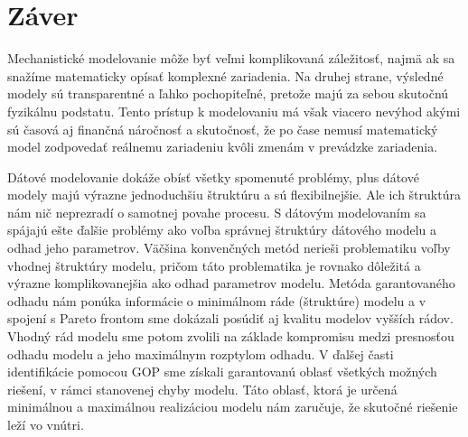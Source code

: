 \chapter{Záver}
Mechanistické modelovanie môže byť veľmi komplikovaná záležitosť, najmä ak sa snažíme matematicky opísať komplexné zariadenia. Na druhej strane, výsledné modely sú transparentné a ľahko pochopiteľné, pretože majú za sebou skutočnú fyzikálnu podstatu. Tento prístup k modelovaniu má však viacero nevýhod akými sú časová aj finančná náročnosť a skutočnosť, že po čase nemusí matematický model zodpovedať reálnemu zariadeniu kvôli zmenám v prevádzke zariadenia. 

Dátové modelovanie dokáže obísť všetky spomenuté problémy, plus dátové modely majú výrazne jednoduchšiu štruktúru a sú flexibilnejšie. Ale ich štruktúra nám nič neprezradí o samotnej povahe procesu. S dátovým modelovaním sa spájajú ešte ďalšie problémy ako voľba správnej štruktúry dátového modelu a odhad jeho parametrov. Väčšina konvenčných metód nerieši problematiku voľby vhodnej štruktúry modelu, pričom táto problematika je rovnako dôležitá a výrazne komplikovanejšia ako odhad parametrov modelu. Metóda garantovaného odhadu nám ponúka informácie o minimálnom ráde (štruktúre) modelu a v spojení s Pareto frontom sme dokázali posúdiť aj kvalitu modelov vyšších rádov. Vhodný rád modelu sme potom zvolili na základe kompromisu medzi presnosťou odhadu modelu a jeho maximálnym rozptylom odhadu. V ďalšej časti identifikácie pomocou GOP sme získali garantovanú oblasť všetkých možných riešení, v rámci stanovenej chyby modelu. Táto oblasť, ktorá je určená minimálnou a maximálnou realizáciou modelu nám zaručuje, že skutočné riešenie leží vo vnútri.

